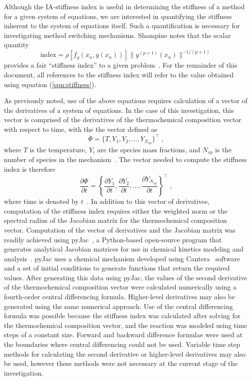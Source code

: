\documentclass[12pt]{ussci}
\begin{document}
Although the IA-stiffness index is useful in determining the stiffness of a method for a given system of equations, we are interested in quantifying the stiffness inherent to the system of equations itself.
Such a quantification is necessary for investigating method switching mechanisms.
Shampine notes that the scalar quantity
\begin{equation}\label{eqn:stiffness}
    \textrm{index} = \rho [f_y(x_n,y(x_n))] \|y^{(p+1)}(x_n)\|^{-1/(p+1)}
\end{equation}
provides a fair ``stiffness index'' to a given problem~\cite{Shampine1985}. For the remainder of this document, all references to the stiffness index will refer to the value obtained using equation (\ref{eqn:stiffness}).

As previously noted, use of the above equations requires calculation of a vector of the derivatives of a system of equations.
In the case of this investigation, this vector is comprised of the derivatives of the thermochemical composition vector with respect to time, with the the vector defined as
\begin{equation}
    \Phi = \{T, Y_1, Y_2, \dots, Y_{N_{sp}} \}^\intercal \;,
\end{equation}
where $T$ is the temperature, $Y_i$ are the species mass fractions, and $N_{sp}$ is the number of species in the mechanism~\cite{Niemeyer:2017}.
The vector needed to compute the stiffness index is therefore
\begin{equation}
    \frac{\partial \Phi}{\partial t} = \left\{\frac{\partial Y_1}{\partial t}, \frac{\partial Y_2}{\partial t}, \dots, \frac{\partial Y_{N_{sp}}}{\partial t} \right\}^\intercal \;,
\end{equation}
where time is denoted by $t$~\cite{Niemeyer:2017}.
In addition to this vector of derivatives, computation of the stiffness index requires either the weighted norm or the spectral radius of the Jacobian matrix for the thermochemical composition vector.
Computation of the vector of derivatives and the Jacobian matrix was readily achieved using pyJac~\cite{pyJac:1.0.2}, a Python-based open-source program that generates analytical Jacobian matrices for use in chemical kinetics modeling and analysis~\cite{Niemeyer:2017}.
pyJac uses a chemical mechanism developed using Cantera~\cite{Goodwin:2015aa} software and a set of initial conditions to generate functions that return the required values.
After generating this data using pyJac, the values of the second derivative of the thermochemical composition vector were calculated numerically using a fourth-order central differencing formula.
Higher-level derivatives may also be generated using the same numerical approach.
Use of the central differencing formula was possible because the stiffness index was calculated after solving for the thermochemical composition vector, and the reaction was modeled using time steps of a constant size.
Forward and backward difference formulae were used at the boundaries where central differencing could not be used.
Variable time step methods for calculating the second derivative or higher-level derivatives may also be used, however these methods were not necessary at the current stage of the investigation.
\end{document}
